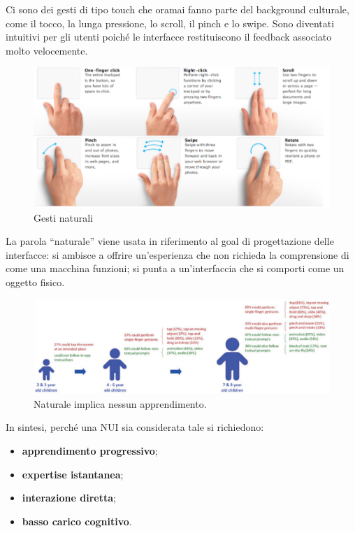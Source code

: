 Ci sono dei gesti di tipo touch che oramai fanno parte del background culturale, come il tocco, la lunga pressione, lo scroll, il pinch e lo swipe.
Sono diventati intuitivi per gli utenti poich\'e le interfacce restituiscono il feedback associato molto velocemente.
\begin{figure}[!h]
	\centering
	\includegraphics[scale=0.3]{immagini/nui-gesti-naturali.png}
	\caption{Gesti naturali}
\end{figure}

La parola ``naturale'' viene usata in riferimento al goal di progettazione delle interfacce: si ambisce a offrire un'esperienza che non richieda
la comprensione di come una macchina funzioni; si punta a un'interfaccia che si comporti come un oggetto fisico.

\begin{figure}[!h]
	\centering
	\includegraphics[scale=0.25]{immagini/nui-bambini.png}
	\caption{Naturale implica nessun apprendimento.}
\end{figure}

In sintesi, perch\'e una NUI sia considerata tale si richiedono:
\begin{itemize}
	\itemsep-0.3em
	\item \textbf{apprendimento progressivo};
	\item \textbf{expertise istantanea};
	\item \textbf{interazione diretta};
	\item \textbf{basso carico cognitivo}.
\end{itemize}

